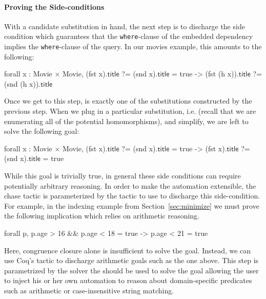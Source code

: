\documentclass[preprint]{sigplanconf}
\newcommand{\ltac}[0]{\ensuremath{\mathcal{L}_{\mathrm{tac}}}}
\begin{document}
\paragraph{Proving the Side-conditions}
With a candidate substitution in hand, the next step is to discharge the side condition which guarantees that the {\tt where}-clause of the embedded dependency implies the {\tt where}-clause of the query.
In our movies example, this amounts to the following: %
\begin{coq}
forall x : Movie $\times$ Movie, (fst x).$\textsf{title}$ ?= (snd x).$\textsf{title}$ = true
     -> (fst (h x)).$\textsf{title}$ ?= (snd (h x)).$\textsf{title}$
\end{coq}

Once we get to this step,  is exactly one of the substitutions constructed by the previous step.
When we plug in a particular substitution, i.e.  (recall that we are enumerating all of the potential homomorphisms), and simplify, we are left to solve the following goal: %
\begin{coq}
forall x : Movie $\times$ Movie, (fst x).$\textsf{title}$ ?= (snd x).$\textsf{title}$ = true
     -> (fst x).$\textsf{title}$ ?= (snd x).$\textsf{title}$ = true
\end{coq}

While this goal is trivially true, in general these side conditions can require potentially arbitrary reasoning.
In order to make the automation extensible, the chase tactic is parameterized by the tactic to use to discharge this side-condition.
For example, in the indexing example from Section~\ref{sec:minimize} we must prove the following implication which relies on arithmetic reasoning.
\begin{coq}
forall p, p.age > 16 && p.age < 18 = true ->
          p.age < 21 = true
\end{coq}
Here, congruence closure alone is insufficient to solve the goal.
Instead, we can use Coq's  tactic to discharge arithmetic goals such as the one above.
This step is parametrized by the solver the should be used to solve the goal allowing the user to inject his or her own automation to reason about domain-specific predicates such as arithmetic or case-insensitive string matching.
\end{document}
